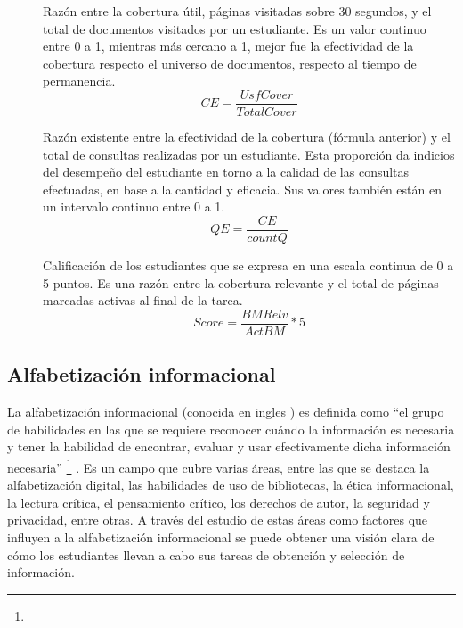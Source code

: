 \begin{description}
	\item [] Razón entre la cobertura útil, páginas visitadas sobre 30 segundos, y el total de documentos visitados por un estudiante. Es un valor continuo entre 0 a 1, mientras más cercano a 1, mejor fue la efectividad de la cobertura respecto el universo de documentos, respecto al tiempo de permanencia.     
	\begin{equation}
	CE = \frac{UsfCover}{TotalCover}
	\end{equation}

	\item [] Razón existente entre la efectividad de la cobertura (fórmula anterior) y el total de consultas realizadas por un estudiante. Esta proporción da indicios del desempeño del estudiante en torno a la calidad de las consultas efectuadas, en base a la cantidad y eficacia. Sus valores también están en un intervalo continuo entre 0 a 1.
	\begin{equation}
	QE = \frac{CE}{countQ}
	\end{equation}

	\item [] Calificación de los estudiantes que se expresa en una escala continua de 0 a 5 puntos. Es una razón entre la cobertura relevante y el total de páginas marcadas activas al final de la tarea. 
	\begin{equation}
	Score = \frac{BMRelv}{ActBM} * 5
	\end{equation}

\end{description}

\subsection{Alfabetización informacional}
\label{subsec:alfabetizacion}
La alfabetización informacional (conocida en ingles ) es definida como “el grupo de habilidades en las que se requiere reconocer cuándo la información es necesaria y tener la habilidad de encontrar, evaluar y usar efectivamente dicha información necesaria” \footnote{\traduccionlibre} \parencite[p.~2]{american2000information}. Es un campo que cubre varias áreas, entre las que se destaca la alfabetización digital, las habilidades de uso de bibliotecas, la ética informacional, la lectura crítica, el pensamiento crítico, los derechos de autor, la seguridad y privacidad, entre otras. A través del estudio de estas áreas como factores que influyen a la alfabetización informacional se puede obtener una visión clara de cómo los estudiantes llevan a cabo sus tareas de obtención y selección de información.

